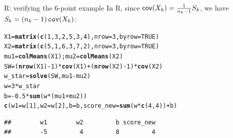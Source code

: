 \documentclass[aspectratio=169]{beamer}\usepackage[]{graphicx}\usepackage[]{xcolor}
\makeatletter
\newcommand{\hlnum}[1]{\textcolor[rgb]{0.686,0.059,0.569}{#1}}%
\newcommand{\hlopt}[1]{\textcolor[rgb]{0,0,0}{#1}}%
\newcommand{\hldef}[1]{\textcolor[rgb]{0.345,0.345,0.345}{#1}}%
\newcommand{\hlkwb}[1]{\textcolor[rgb]{0.69,0.353,0.396}{#1}}%
\newcommand{\hlkwc}[1]{\textcolor[rgb]{0.333,0.667,0.333}{#1}}%
\newcommand{\hlkwd}[1]{\textcolor[rgb]{0.737,0.353,0.396}{\textbf{#1}}}%
\newenvironment{kframe}{%
 \def\at@end@of@kframe{}%
 \ifinner\ifhmode%
  \def\at@end@of@kframe{\end{minipage}}%
  \begin{minipage}{\columnwidth}%
 \fi\fi%
 \def\FrameCommand##1{\hskip\@totalleftmargin \hskip-\fboxsep
 \colorbox{shadecolor}{##1}\hskip-\fboxsep
     \hskip-\linewidth \hskip-\@totalleftmargin \hskip\columnwidth}%
 \MakeFramed {\advance\hsize-\width
   \@totalleftmargin\z@ \linewidth\hsize
   \@setminipage}}%
 {\par\unskip\endMakeFramed%
 \at@end@of@kframe}
\newenvironment{knitrout}{}{} %
\makeatother
\begin{document}
\begin{frame}[fragile]{R: verifying the 6-point example}
    In R, since $\mathsf{cov}(X_k) = \frac{1}{n_k - 1}S_k$, we have $S_k = (n_k - 1)\,{\tt cov}(X_k)$:
\begin{knitrout}
\color{fgcolor}\begin{kframe}
\begin{alltt}
\hldef{X1} \hlkwb{=} \hlkwd{matrix}\hldef{(}\hlkwd{c}\hldef{(}\hlnum{1}\hldef{,} \hlnum{3}\hldef{,}  \hlnum{2}\hldef{,} \hlnum{5}\hldef{,}  \hlnum{3}\hldef{,} \hlnum{4}\hldef{),} \hlkwc{nrow} \hldef{=} \hlnum{3}\hldef{,} \hlkwc{byrow} \hldef{=} \hlnum{TRUE}\hldef{)}
\hldef{X2} \hlkwb{=} \hlkwd{matrix}\hldef{(}\hlkwd{c}\hldef{(}\hlnum{5}\hldef{,} \hlnum{1}\hldef{,}  \hlnum{6}\hldef{,} \hlnum{3}\hldef{,}  \hlnum{7}\hldef{,} \hlnum{2}\hldef{),} \hlkwc{nrow} \hldef{=} \hlnum{3}\hldef{,} \hlkwc{byrow} \hldef{=} \hlnum{TRUE}\hldef{)}
\hldef{mu1} \hlkwb{=} \hlkwd{colMeans}\hldef{(X1); mu2} \hlkwb{=} \hlkwd{colMeans}\hldef{(X2)}
\hldef{SW} \hlkwb{=} \hldef{(}\hlkwd{nrow}\hldef{(X1)} \hlopt{-} \hlnum{1}\hldef{)} \hlopt{*} \hlkwd{cov}\hldef{(X1)} \hlopt{+} \hldef{(}\hlkwd{nrow}\hldef{(X2)} \hlopt{-} \hlnum{1}\hldef{)} \hlopt{*} \hlkwd{cov}\hldef{(X2)}
\hldef{w_star} \hlkwb{=} \hlkwd{solve}\hldef{(SW, mu1} \hlopt{-} \hldef{mu2)}
\hldef{w} \hlkwb{=} \hlnum{3} \hlopt{*} \hldef{w_star}
\hldef{b} \hlkwb{=} \hlopt{-}\hlnum{0.5} \hlopt{*} \hlkwd{sum}\hldef{(w} \hlopt{*} \hldef{(mu1} \hlopt{+} \hldef{mu2))}
\hlkwd{c}\hldef{(}\hlkwc{w1} \hldef{= w[}\hlnum{1}\hldef{],} \hlkwc{w2} \hldef{= w[}\hlnum{2}\hldef{],} \hlkwc{b} \hldef{= b,} \hlkwc{score_new} \hldef{=} \hlkwd{sum}\hldef{(w} \hlopt{*} \hlkwd{c}\hldef{(}\hlnum{4}\hldef{,} \hlnum{4}\hldef{))} \hlopt{+} \hldef{b)}
\end{alltt}
\begin{verbatim}
##        w1        w2         b score_new 
##        -5         4         8         4
\end{verbatim}
\end{kframe}
\end{knitrout}
\end{frame}



\end{document}
